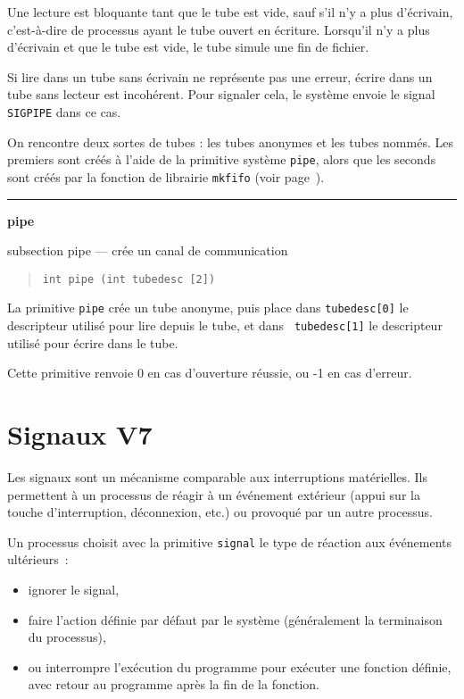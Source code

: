 \documentclass [twoside] {report}
\newcommand {\primitive} [1]
    {
	\phantomsection
	{\large \bf #1}
	\addcontentsline {toc} {subsection} {#1}
    }
\newcommand {\separation}
    {
	\vspace {5mm}
	\nopagebreak
	\hrule
    }
\begin{document}
Une lecture est bloquante tant que le tube est vide, sauf s'il n'y a
plus d'écrivain, c'est-à-dire de processus ayant le tube ouvert en
écriture. Lorsqu'il n'y a plus d'écrivain et que le tube est vide,
le tube simule une fin de fichier.

Si lire dans un tube sans écrivain ne représente pas une erreur,
écrire dans un tube sans lecteur est incohérent. Pour signaler
cela, le système envoie le signal {\tt SIGPIPE} dans ce cas.

On rencontre deux sortes de tubes : les tubes anonymes et
les tubes nommés. Les premiers sont créés à l'aide de la
primitive système {\tt pipe}, alors que les seconds sont créés par
la fonction de librairie {\tt mkfifo} (voir page~\pageref {mkfifo}).


\separation
\primitive {pipe} --- crée un canal de communication

\begin {quote}
\begin {verbatim}
int pipe (int tubedesc [2])
\end{verbatim}
\end {quote}

La primitive {\tt pipe} crée un tube anonyme,
puis place dans {\tt tubedesc[0]}
le descripteur utilisé pour lire depuis le tube, et dans {\tt
tubedesc[1]} le descripteur utilisé pour écrire dans le tube.

Cette primitive renvoie 0 en cas d'ouverture
réussie, ou -1 en cas d'erreur.






\section {Signaux V7}


Les signaux sont un mécanisme comparable aux interruptions
matérielles. Ils permettent à un processus de réagir à un
événement extérieur (appui sur la touche d'interruption,
déconnexion, etc.) ou provoqué par un autre processus.

Un processus choisit avec la primitive {\tt signal}
le type de réaction aux événements ultérieurs~:

\begin {itemize}
    \item ignorer le signal,
    \item faire l'action définie par défaut par le
	système (généralement la terminaison du processus),
    \item ou interrompre l'exécution du programme pour exécuter
	une fonction définie, avec retour au programme après
	la fin de la fonction.
\end {itemize}
\end{document}
